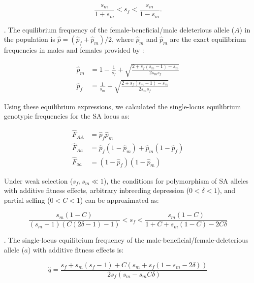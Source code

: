 \documentclass{article}
\begin{document}
\begin{equation} 
    \frac{s_m}{1 + s_m} < s_f < \frac{s_m}{1 - s_m}.
\end{equation}

\noindent \citep{Kidwell1977}. The equilibrium frequency of the female-beneficial/male deleterious allele ($A$) in the population is $\hat{p} = (\hat{p}_{f} + \hat{p}_{m})/2$, where $\hat{p}_{m}$ and $\hat{p}_{m}$ are the exact equilibrium frequencies in males and females provided by \citet{Kidwell1977}:

\begin{subequations}
    \begin{align} 
        \hat{p}_{m} &= 1 - \frac{1}{s_f} + \sqrt{\frac{2 + s_f (s_m - 1) - s_m}{2 s_m s_f}} \\
        \hat{p}_{f} &= \frac{1}{s_m} + \sqrt{\frac{2 + s_f (s_m - 1) - s_m}{2 s_m s_f}} 
    \end{align}
\end{subequations}

Using these equilibrium expressions, we calculated the single-locus equilibrium genotypic frequencies for the SA locus as:

\begin{subequations}
    \begin{align} 
        \hat{F}_{AA} &= \hat{p}_f \hat{p}_m \label{eq:obOutGenoEq1} \\
        \hat{F}_{Aa} &= \hat{p}_f (1 - \hat{p}_m) + \hat{p}_m(1 - \hat{p}_f) \label{eq:obOutGenoEq2} \\
        \hat{F}_{aa} &= (1 - \hat{p}_f) (1 - \hat{p}_m) \label{eq:obOutGenoEq3}
    \end{align}
\end{subequations}

Under weak selection ($s_f,s_m \ll 1$), the conditions for polymorphism of SA alleles with additive fitness effects, arbitrary inbreeding depression ($0 < \delta < 1$), and partial selfing ($0 < C < 1$) can be approximated as:

\begin{equation} 
    \frac{s_m(1 - C)}{(s_m - 1)(C(2 \delta - 1) - 1)} < s_f < \frac{s_m(1 - C)}{1 + C + s_m(1 - C) - 2 C \delta}
\end{equation}

\noindent \citep{JordanConnallon2014}. The single-locus equilibrium frequency of the male-beneficial/female-deleterious allele ($a$) with additive fitness effects is:

\begin{equation} 
    \hat{q} = \frac{s_f + s_m(s_f -1) + C(s_m + s_f(1 - s_m - 2 \delta))}{2 s_f(s_m - s_m C \delta)}
\end{equation}
\end{document}

